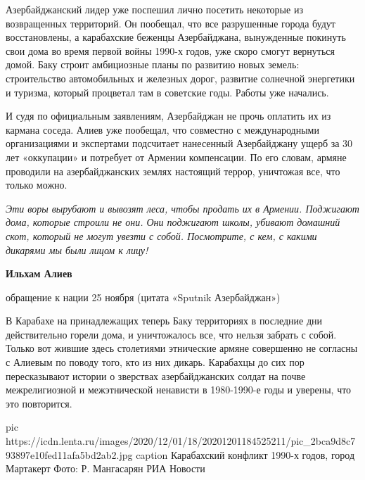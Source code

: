 Азербайджанский лидер уже поспешил лично посетить некоторые из возвращенных
территорий. Он пообещал, что все разрушенные города будут восстановлены, а
карабахские беженцы Азербайджана, вынужденные покинуть свои дома во время
первой войны 1990-х годов, уже скоро смогут вернуться домой. Баку строит
амбициозные планы по развитию новых земель: строительство автомобильных и
железных дорог, развитие солнечной энергетики и туризма, который процветал там
в советские годы. Работы уже начались.

И судя по официальным заявлениям, Азербайджан не прочь оплатить их из кармана
соседа. Алиев уже пообещал, что совместно с международными организациями и
экспертами подсчитает нанесенный Азербайджану ущерб за 30 лет «оккупации» и
потребует от Армении компенсации. По его словам, армяне проводили на
азербайджанских землях настоящий террор, уничтожая все, что только можно.

\begin{leftbar}
\emph{Эти воры вырубают и вывозят леса, чтобы продать их в Армении. Поджигают дома,
которые строили не они. Они поджигают школы, убивают домашний скот,
который не могут увезти с собой. Посмотрите, с кем, с какими дикарями
мы были лицом к лицу!}\par
\textbf{Ильхам Алиев}\par
обращение к нации 25 ноября (цитата «Sputnik Азербайджан»)	
\end{leftbar}

В Карабахе на принадлежащих теперь Баку территориях в последние дни
действительно горели дома, и уничтожалось все, что нельзя забрать с собой.
Только вот жившие здесь столетиями этнические армяне совершенно не согласны с
Алиевым по поводу того, кто из них дикарь. Карабахцы до сих пор пересказывают
истории о зверствах азербайджанских солдат на почве межрелигиозной и
межэтнической ненависти в 1980-1990-е годы и уверены, что это повторится.

\ifcmt
pic https://icdn.lenta.ru/images/2020/12/01/18/20201201184525211/pic_2bca9d8c793897e10fed11afa5bd2ab2.jpg
caption Карабахский конфликт 1990-х годов, город Мартакерт Фото: Р. Мангасарян РИА Новости
\fi
